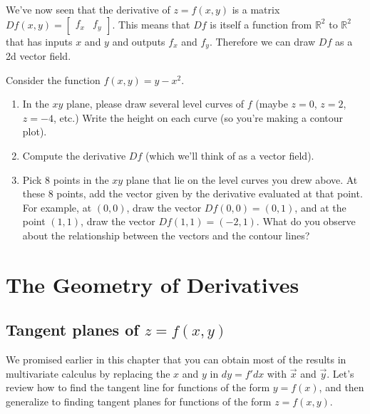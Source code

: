 We've now seen that the derivative of $z=f(x,y)$ is a matrix $Df(x,y) = \begin{bmatrix}f_x & f_y\end{bmatrix}$. This means that $Df$ is itself a function from $\mathbb{R}^2$ to $\mathbb{R}^2$ that has inputs $x$ and $y$ and outputs $f_x$ and $f_y$. Therefore we can draw $Df$ as a 2d vector field.
\begin{problem}%
 Consider the function $f(x,y)=y-x^2$. 
\begin{enumerate}
 \item In the $xy$ plane, please draw several level curves of $f$ (maybe $z=0$, $z=2$, $z=-4$, etc.)  Write the height on each curve (so you're making a contour plot).
 \item Compute the derivative $Df$ (which we'll think of as a vector field).
 \item{}%
 Pick 8 points in the $xy$ plane that lie on the level curves you drew above.  At these 8 points, add the vector given by the derivative evaluated at that point.  For example, at $(0,0)$, draw the vector $Df(0,0)=(0,1)$, and at the point $(1,1)$, draw the vector $Df(1,1)=(-2,1)$.  What do you observe about the relationship between the vectors and the contour lines?
\end{enumerate}

\end{problem}


\section{The Geometry of Derivatives}

\subsection{Tangent planes of $z=f(x,y)$}

We promised earlier in this chapter that you can obtain most of the results in multivariate calculus by replacing the $x$ and $y$ in $dy=f'dx$ with $\vec x$ and $\vec y$.  Let's review how to find the tangent line for functions of the form $y=f(x)$, and then generalize to finding tangent planes for functions of the form $z=f(x,y)$.

